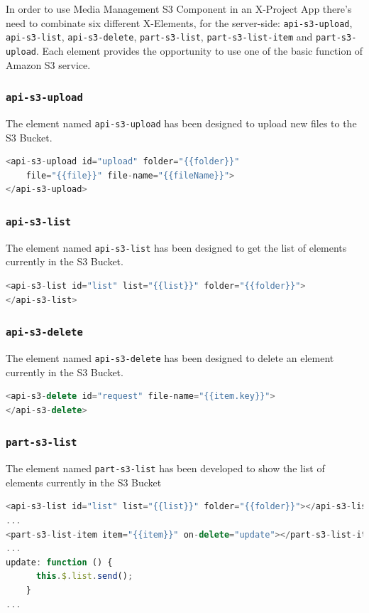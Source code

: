 In order to use Media Management S3 Component in an X-Project App there's need to combinate six different X-Elements, for the server-side: \texttt{api-s3-upload}, \texttt{api-s3-list}, \texttt{api-s3-delete}, \texttt{part-s3-list}, \texttt{part-s3-list-item} and \texttt{part-s3-upload}.
Each element provides the opportunity to use one of the basic function of Amazon S3 service. 

\subsubsection{\texttt{api-s3-upload}}
\label{api-s3-upload}


The element named \texttt{api-s3-upload} has been designed to upload new files to the S3 Bucket.
\begin{lstlisting}[language=javascript]
<api-s3-upload id="upload" folder="{{folder}}"
	file="{{file}}" file-name="{{fileName}}">
</api-s3-upload>
\end{lstlisting}


\subsubsection{\texttt{api-s3-list}}
\label{api-s3-list}
The element named \texttt{api-s3-list} has been designed to get the list of elements currently in the S3 Bucket.
\begin{lstlisting}[language=javascript]
<api-s3-list id="list" list="{{list}}" folder="{{folder}}">
</api-s3-list>
\end{lstlisting}


\subsubsection{\texttt{api-s3-delete}}
\label{api-s3-delete}
The element named \texttt{api-s3-delete} has been designed to delete an element currently in the S3 Bucket.
\begin{lstlisting}[language=javascript]
<api-s3-delete id="request" file-name="{{item.key}}">
</api-s3-delete>
\end{lstlisting}


\subsubsection{\texttt{part-s3-list}}
\label{part-s3-list}
The element named \texttt{part-s3-list} has been developed to show the list of elements currently in the S3 Bucket
\begin{lstlisting}[language=javascript]
<api-s3-list id="list" list="{{list}}" folder="{{folder}}"></api-s3-list>
...
<part-s3-list-item item="{{item}}" on-delete="update"></part-s3-list-item>
...
update: function () {
      this.$.list.send();
    }
...
\end{lstlisting}



